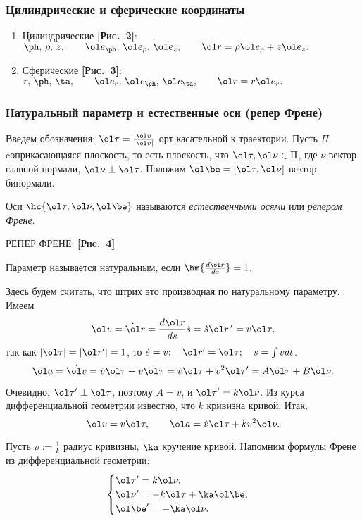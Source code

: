 \documentclass[a4paper,12pt]{article}
\def\a{\ol a}
\def\r{\ol r}
\def\v{\ol v}
\def\e{\ol e}
\def\vtau{\ol\tau}
\def\vnu{\ol\nu}
\def\d{\dot}
\def\pic#1{ \hbox{\textbf{\textsc{[Рис.~#1]}}}}
\begin{document}
\subsubsection{Цилиндрические и сферические  координаты}

\begin{enumerate}
\item Цилиндрические \pic{2}: $\ph,\,\rho,\,z,\qquad\e_\ph,\,\e_\rho,\,\e_z,\qquad \r=\rho\e_\rho+z\e_z.$
\item Сферические \pic{3}: $r,\,\ph,\,\ta,\qquad\e_r,\,\e_\ph,\,\e_\ta,\qquad \r= r \e_r.$
\end{enumerate}

\subsubsection{Натуральный параметр и естественные оси (репер Френе)}

Введем обозначения: $\vtau=\frac{\v}{|\v|}$ орт касательной
к траектории. Пусть $\Pi$ cоприкасающаяся плоскость,
то есть плоскость, что $\vtau,\vnu\in\Pi$, где $\nu$ вектор главной
нормали, $\vnu\perp\vtau$.
Положим $\ol\be=[\vtau,\vnu]$ вектор бинормали.

\begin{df}
Оси $\hc{\vtau,\vnu, \ol\be}$
называются \emph{естественными осями} или \emph{репером
Френе}.
\end{df}

РЕПЕР ФРЕНЕ: \pic{4}

\begin{df}
Параметр называется натуральным, если $\hm{\frac{d\r}{ds}}=1$.
\end{df}

Здесь будем считать, что штрих это производная по натуральному параметру.
Имеем
$$\v=\d\r=\frac{d\r}{ds}\d s=\d s\r\,'=v\vtau,$$
так как  $|\vtau|=|\r'|=1$, то $\d s=v;\quad
\r'=\vtau;\quad s=\int vdt$.
$$\a=\d{\v}=\d
v\vtau+v\d{\vtau}=\d
v\vtau+v^2\vtau'=A\vtau+B\vnu.$$

Очевидно, $\vtau'\perp\vtau$, поэтому $A=\d v$, и $\vtau'=k\vnu$.
Из курса дифференциальной геометрии известно, что $k$
кривизна кривой. Итак,
$$\v=v\vtau,\qquad \a=\d v\vtau+kv^2\vnu.$$

Пусть $\rho:=\frac1k$ радиус кривизны, $\ka$ кручение кривой.
Напомним формулы Френе из дифференциальной геометрии:
$$
\begin{cases}
\vtau'=k\vnu,\\
\vnu'=-k\vtau+\ka\ol\be,\\
\ol\be'=-\ka\vnu.
\end{cases}
$$
\end{document}
